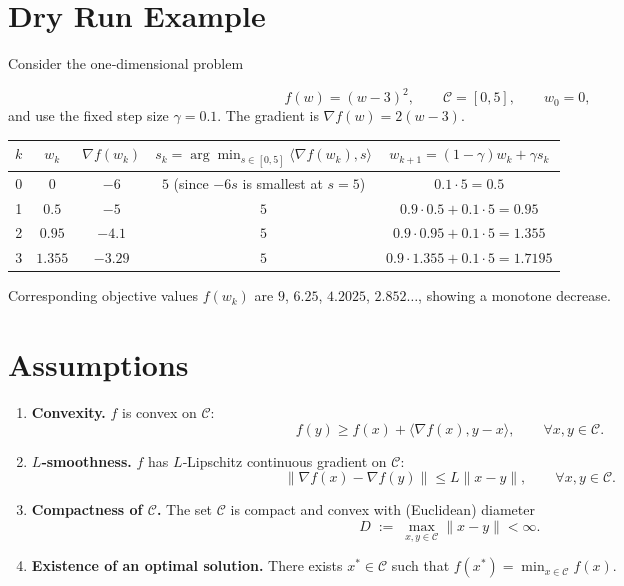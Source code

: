 \documentclass{article}
\begin{document}
\section*{Dry Run Example}
Consider the one‑dimensional problem  

\[
f(w)=(w-3)^{2},\qquad \mathcal C=[0,5],\qquad w_{0}=0,
\]
and use the fixed step size $\gamma=0.1$.  
The gradient is $\nabla f(w)=2(w-3)$.  

\begin{center}
\begin{tabular}{c|c|c|c|c}
$k$ & $w_{k}$ & $\nabla f(w_{k})$ & $s_{k}=\arg\min_{s\in[0,5]}\langle\nabla f(w_{k}),s\rangle$ & $w_{k+1}=(1-\gamma)w_{k}+\gamma s_{k}$\\ \hline
0 & $0$ & $-6$ & $5$ (since $-6s$ is smallest at $s=5$) & $0.1\cdot5=0.5$\\
1 & $0.5$ & $-5$ & $5$ & $0.9\cdot0.5+0.1\cdot5=0.95$\\
2 & $0.95$ & $-4.1$ & $5$ & $0.9\cdot0.95+0.1\cdot5=1.355$\\
3 & $1.355$ & $-3.29$ & $5$ & $0.9\cdot1.355+0.1\cdot5=1.7195$
\end{tabular}
\end{center}
Corresponding objective values $f(w_{k})$ are $9$, $6.25$, $4.2025$, $2.852\ldots$, showing a monotone decrease.

\newpage

\section*{Assumptions}
\begin{enumerate}[label=\textbf{A\arabic*.},leftmargin=*]
\item \label{A1} \textbf{Convexity.} $f$ is convex on $\mathcal C$:  
\[
f(y)\ge f(x)+\langle\nabla f(x),y-x\rangle,\qquad\forall x,y\in\mathcal C .
\]

\item \label{A2} \textbf{$L$‑smoothness.} $f$ has $L$‑Lipschitz continuous gradient on $\mathcal C$:  
\[
\|\nabla f(x)-\nabla f(y)\|\le L\|x-y\|,\qquad\forall x,y\in\mathcal C .
\]

\item \label{A3} \textbf{Compactness of $\mathcal C$.}  
The set $\mathcal C$ is compact and convex with (Euclidean) diameter
\[
D\;:=\;\max_{x,y\in\mathcal C}\|x-y\|<\infty .
\]

\item \label{A4} \textbf{Existence of an optimal solution.}  
There exists $x^{*}\in\mathcal C$ such that $f(x^{*})=\min_{x\in\mathcal C}f(x)$.
\end{enumerate}
\end{document}
